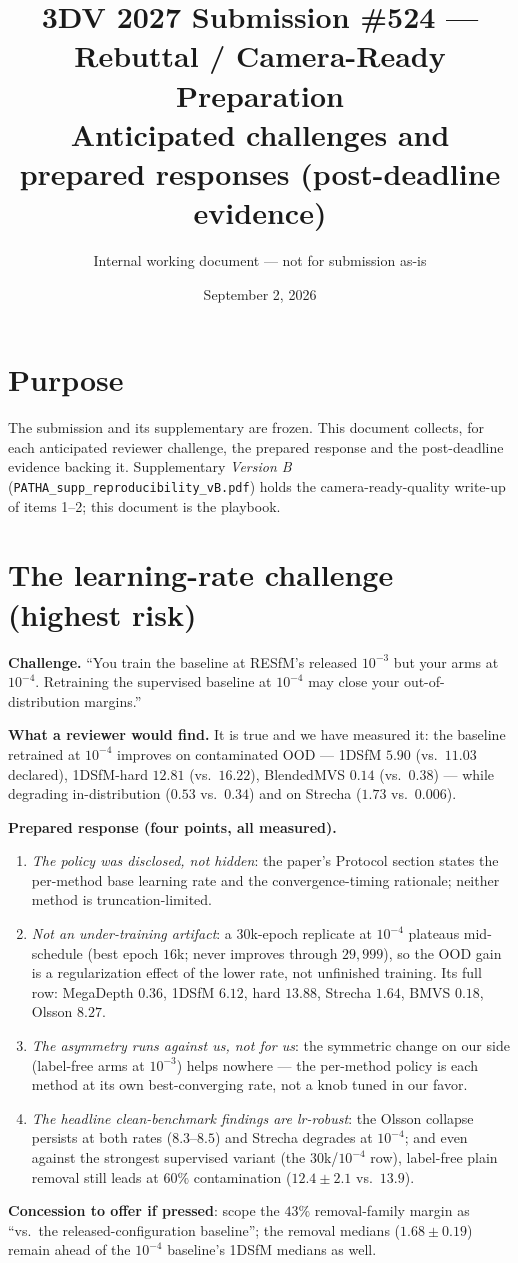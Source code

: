 \documentclass[10pt,letterpaper]{article}
\title{\vspace{-1.5em}3DV 2027 Submission \#524 --- Rebuttal / Camera-Ready Preparation\\
\large Anticipated challenges and prepared responses (post-deadline evidence)}
\author{Internal working document --- not for submission as-is}
\date{September 2, 2026}
\begin{document}
\maketitle
\vspace{-1.5em}

\section*{Purpose}
The submission and its supplementary are frozen. This document collects, for each
anticipated reviewer challenge, the prepared response and the post-deadline evidence
backing it. Supplementary \emph{Version B} (\texttt{PATHA\_supp\_reproducibility\_vB.pdf})
holds the camera-ready-quality write-up of items 1--2; this document is the playbook.

\section{The learning-rate challenge (highest risk)}
\textbf{Challenge.} ``You train the baseline at RESfM's released $10^{-3}$ but your arms
at $10^{-4}$. Retraining the supervised baseline at $10^{-4}$ may close your
out-of-distribution margins.''

\textbf{What a reviewer would find.} It is true and we have measured it: the baseline
retrained at $10^{-4}$ improves on contaminated OOD --- 1DSfM $5.90$ (vs.\ $11.03$
declared), 1DSfM-hard $12.81$ (vs.\ $16.22$), BlendedMVS $0.14$ (vs.\ $0.38$) --- while
degrading in-distribution ($0.53$ vs.\ $0.34$) and on Strecha ($1.73$ vs.\ $0.006$).

\textbf{Prepared response (four points, all measured).}
\begin{enumerate}\itemsep2pt
\item \emph{The policy was disclosed, not hidden}: the paper's Protocol section states the
per-method base learning rate and the convergence-timing rationale; neither method is
truncation-limited.
\item \emph{Not an under-training artifact}: a $30$k-epoch replicate at $10^{-4}$
plateaus mid-schedule (best epoch $16$k; never improves through $29{,}999$), so the OOD
gain is a regularization effect of the lower rate, not unfinished training. Its full row:
MegaDepth $0.36$, 1DSfM $6.12$, hard $13.88$, Strecha $1.64$, BMVS $0.18$, Olsson $8.27$.
\item \emph{The asymmetry runs against us, not for us}: the symmetric change on our side
(label-free arms at $10^{-3}$) helps nowhere --- the per-method policy is each method at
its own best-converging rate, not a knob tuned in our favor.
\item \emph{The headline clean-benchmark findings are lr-robust}: the Olsson collapse
persists at both rates ($8.3$--$8.5$) and Strecha degrades at $10^{-4}$; and even against
the strongest supervised variant (the $30$k/$10^{-4}$ row), label-free plain removal
still leads at $60\%$ contamination ($12.4\pm2.1$ vs.\ $13.9$).
\end{enumerate}
\textbf{Concession to offer if pressed}: scope the $43\%$ removal-family margin as
``vs.\ the released-configuration baseline''; the removal medians ($1.68\pm0.19$) remain
ahead of the $10^{-4}$ baseline's 1DSfM medians as well.
\end{document}
